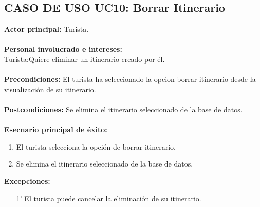 \documentclass[11pt]{article}
\begin{document}
\subsection*{\textbf{CASO DE USO UC10: Borrar Itinerario}  }
\textbf{Actor principal:} Turista.\\
\\
\textbf{Personal involucrado e intereses: }\\
\underline{Turista}:Quiere eliminar un itinerario creado por él.
\\\\
\textbf{Precondiciones:} El turista ha seleccionado la opcion borrar itinerario desde la visualización de su itinerario.\\
\\
\textbf{Postcondiciones:} Se elimina el itinerario seleccionado de la base de datos.\\
\\
\textbf{Esecnario principal de éxito:}
\begin{enumerate}
\item El turista selecciona la opción de borrar itinerario.
\item Se elimina el itinerario seleccionado de la base de datos.
\end{enumerate}
\textbf{Excepciones:}
\begin{enumerate}
\item[1'] El turista puede cancelar la eliminación de su itinerario.
\end{enumerate}
\end{document}

